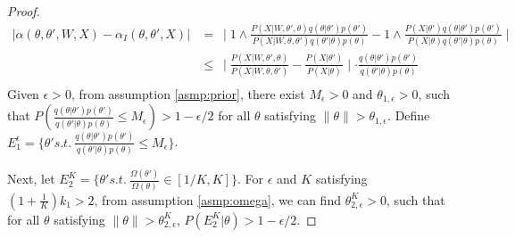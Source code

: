 \begin{proof}
\begin{align*}
|\alpha(\theta, \theta', W, X) - \alpha_I(\theta, \theta', X)| &= \ \mid 1 \wedge \frac{P(X | W, \theta' , \theta)q(\theta | \theta')p(\theta')}{P(X | W, \theta , \theta')q(\theta' | \theta)p(\theta)} - 1 \wedge \frac{P(X | \theta')q(\theta | \theta')p(\theta')}{P(X | \theta)q(\theta' | \theta)p(\theta)} \mid \\
& \leq \ \mid \frac{P(X | W, \theta' , \theta)}{P(X | W, \theta , \theta')} - \frac{P(X | \theta')}{P(X | \theta)}\mid  \cdot  \frac{q(\theta | \theta')p(\theta')}{q(\theta' | \theta)p(\theta)}\\
\end{align*}
Given $\epsilon > 0$, from assumption \ref{asmp:prior}, there exist $M_\epsilon > 0$ and $\theta_{1,\epsilon} > 0$, such that $P(\frac{q(\theta | \theta')p(\theta')}{q(\theta' | \theta)p(\theta)}\leq M_\epsilon) > 1 - \epsilon / 2$ {for all } $\theta$ satisfying $ \| \theta \| > \theta_{1,\epsilon}$.
Define $E_1^\epsilon = \{\theta' s.t.\ \frac{q(\theta | \theta')p(\theta')}{q(\theta' | \theta)p(\theta)}\leq M_\epsilon\}$.%

Next, let $E^K_2 = \{\theta' s.t.\ \frac{\Omega(\theta')}{\Omega(\theta)}\in [1/K, K] \}$. For $\epsilon$ and $K$ satisfying $(1 + \frac{1}{K})k_1 > 2$, from assumption \ref{asmp:omega}, we can find $\theta_{2, \epsilon}^K > 0$, such that for all $\theta$ satisfying $\| \theta \| > \theta_{2, \epsilon}^K$,
$P(E^K_2 | \theta) > 1 - \epsilon / 2$.


\end{proof}
